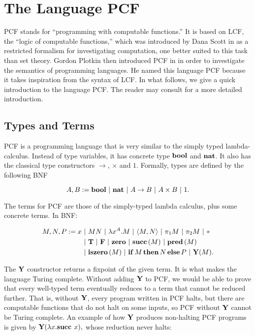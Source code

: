 
\section{The Language PCF}

PCF stands for ``programming with computable functions.'' It is based on LCF, the ``logic of computable functions,'' which was introduced by Dana Scott in \cite{LCF} as a restricted formalism for investigating computation, one better suited to this task than set theory. Gordon Plotkin then introduced PCF in \cite{PCF} in order to investigate the semantics of programming languages. He named this language PCF because it takes inspiration from the syntax of LCF. In what follows, we give a quick introduction to the language PCF. The reader may consult \cite{LambdaNotes} for a more detailed introduction.

\subsection{Types and Terms}

PCF is a programming language that is very similar to the simply typed lambda-calculus. Instead of type variables, it has concrete type $\mathbf{bool}$ and $\mathbf{nat}$. It also has the classical type constructors $\to$, $\times$ and $1$. Formally, types are defined by the following BNF

\[ A, B := \mathbf{bool} \ \mathbf{|}\  \mathbf{nat} \ \mathbf{|}\  A\to B \ \mathbf{|}\  A\times B \ \mathbf{|}\  1. \]

The terms for PCF are those of the simply-typed lambda calculus, plus some concrete terms. In BNF:

\begin{align*}
    M, N, P := x &\ \mathbf{|}\  MN \ \mathbf{|}\  \lambda x^A.M \ \mathbf{|}\  \langle M, N\rangle \ \mathbf{|}\  \pi_1M \ \mathbf{|}\  \pi_2M \ \mathbf{|}\  * \\
    &\ \mathbf{|}\  \mathbf{T} \ \mathbf{|}\  \mathbf{F} \ \mathbf{|}\  \mathbf{zero} \ \mathbf{|}\  \mathbf{succ}\,(M) \ \mathbf{|}\  \mathbf{pred}\,(M) \\
    &\ \mathbf{|}\  \mathbf{iszero}\,(M) \ \mathbf{|}\  \mathbf{if}\,M\,\mathbf{then}\,N\,\mathbf{else}\,P \ \mathbf{|}\  \mathbf{Y}(M).
\end{align*}

The $\mathbf{Y}$ constructor returns a fixpoint of the given term. It is what makes the language Turing complete. Without adding $\textbf{Y}$ to PCF, we would be able to prove that every well-typed term eventually reduces to a term that cannot be reduced further. That is, without $\textbf{Y}$, every program written in PCF halts, but there are computable functions that do not halt on some inputs, so PCF without $\textbf{Y}$ cannot be Turing complete. An example of how $\textbf{Y}$ produces non-halting PCF programs is given by $\textbf{Y}(\lambda x. \textbf{succ } x),$ whose reduction never halts:

